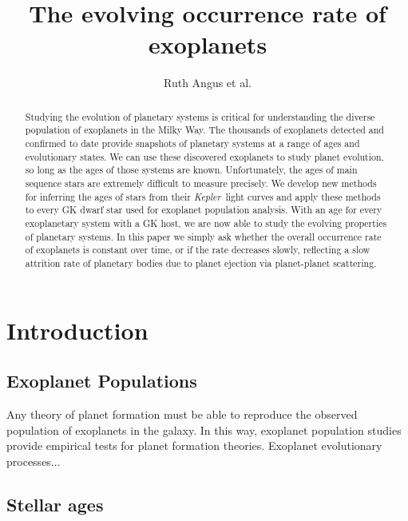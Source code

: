 \documentclass{aastex62}
\newcommand{\Kepler}{{\it Kepler}}
\newcommand{\kepler}{\Kepler}
\begin{document}
\title{The evolving occurrence rate of exoplanets}


\author{Ruth Angus et al.}

\begin{abstract}
Studying the evolution of planetary systems is critical for understanding
the diverse population of exoplanets in the Milky Way.
The thousands of exoplanets detected and confirmed to date provide snapshots
of planetary systems at a range of ages and evolutionary states.
We can use these discovered exoplanets to study planet evolution, so
long as the ages of those systems are known.
Unfortunately, the ages of main sequence stars are extremely difficult to
measure precisely.
We develop new methods for inferring the ages of stars from their \kepler\
light curves and apply these methods to every GK dwarf star used for
exoplanet population analysis.
With an age for every exoplanetary system with a GK host, we are now able to
study the evolving properties of planetary systems.
In this paper we simply ask whether the overall occurrence rate of exoplanets
is constant over time, or if the rate decreases slowly, reflecting a slow
attrition rate of planetary bodies due to planet ejection via planet-planet
scattering.
\end{abstract}


\section{Introduction}
\label{sec:introduction}
\subsection{Exoplanet Populations}
\label{sec:exopops}

Any theory of planet formation must be able to reproduce the observed
population of exoplanets in the galaxy.
In this way, exoplanet population studies provide empirical tests for planet formation theories.
Exoplanet evolutionary processes...

\subsection{Stellar ages}
\label{sec:intro_ages}
\end{document}
